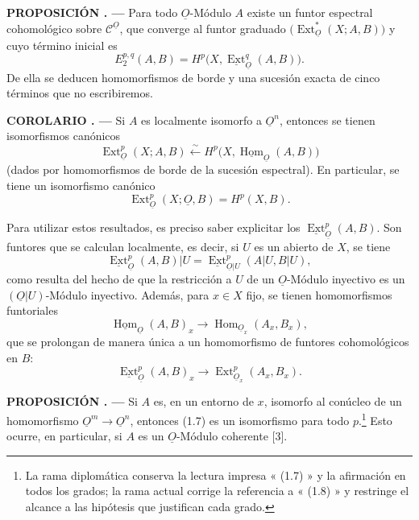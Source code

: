 \documentclass[11pt,twoside,openany]{book}
\numberwithin{equation}{section}
\newcommand{\Osh}{\underline{O}}
\newcommand{\Ccat}{\mathcal C}
\newcommand{\Homsh}{\underline{\operatorname{Hom}}}
\newcommand{\Extsh}{\underline{\operatorname{Ext}}}
\newcommand{\fquote}[1]{\textquotedbl#1\textquotedbl}
\theoremstyle{plain}
\theoremstyle{definition}
\theoremstyle{remark}
\newcommand{\result}[2]{%
  \par\medskip\noindent\textbf{#1%
  \if\relax\detokenize{#2}\relax\else\space#2\fi. ---}\enspace
}
\theoremstyle{plain}
\theoremstyle{definition}
\theoremstyle{remark}
\begin{document}
\result{PROPOSICIÓN}{1} Para todo $\Osh$-Módulo $A$ existe un funtor
espectral cohomológico sobre $\Ccat^{\Osh}$, que converge al funtor graduado
$\bigl(\operatorname{Ext}_{\Osh}^{*}(X;A,B)\bigr)$ y cuyo término inicial es
\begin{equation}\tag{1.4}
  E_{2}^{p,q}(A,B)=H^{p}\bigl(X,\Extsh_{\Osh}^{q}(A,B)\bigr).
\end{equation}
De ella se deducen \fquote{homomorfismos de borde} y una sucesión exacta de cinco términos
que no escribiremos.

\result{COROLARIO}{1} Si $A$ es localmente isomorfo a $\Osh^{n}$, entonces se tienen
isomorfismos canónicos
\begin{equation}\tag{1.5}
  \operatorname{Ext}_{\Osh}^{p}(X;A,B)
  \overset{\sim}{\longleftarrow}
  H^{p}\bigl(X,\Homsh_{\Osh}(A,B)\bigr)
\end{equation}
(dados por homomorfismos de borde de la sucesión espectral). En particular, se tiene
un isomorfismo canónico
\begin{equation}\tag{1.6}
  \operatorname{Ext}_{\Osh}^{p}(X;\Osh,B)=H^{p}(X,B).
\end{equation}

Para utilizar estos resultados, es preciso saber explicitar los
$\Extsh_{\Osh}^{p}(A,B)$. Son funtores que se calculan localmente,
es decir, si $U$ es un abierto de $X$, se tiene
\[
  \Extsh_{\Osh}^{p}(A,B)|U
  =\Extsh_{\Osh|U}^{p}(A|U,B|U),
\]
como resulta del hecho de que la restricción a $U$ de un $\Osh$-Módulo inyectivo
es un $(\Osh|U)$-Módulo inyectivo. Además, para $x\in X$ fijo, se tienen homomorfismos funtoriales
\begin{equation}\tag{1.7}
  \Homsh_{\Osh}(A,B)_x
  \longrightarrow
  \operatorname{Hom}_{\Osh_x}(A_x,B_x),
\end{equation}
que se prolongan de manera única a un homomorfismo de funtores cohomológicos
en $B$:
\begin{equation}\tag{1.8}
  \Extsh_{\Osh}^{p}(A,B)_x
  \longrightarrow
  \operatorname{Ext}_{\Osh_x}^{p}(A_x,B_x).
\end{equation}

\result{PROPOSICIÓN}{2} Si $A$ es, en un entorno de $x$, isomorfo al
conúcleo de un homomorfismo $\Osh^{m}\longrightarrow\Osh^{n}$, entonces (1.7) es un
isomorfismo para todo $p$.\footnote{La rama diplomática conserva la lectura
impresa « (1.7) » y la afirmación en todos los grados; la rama actual corrige
la referencia a « (1.8) » y restringe el alcance a las hipótesis que justifican
cada grado.} Esto ocurre, en
particular, si $A$ es un $\Osh$-Módulo coherente [3].
\end{document}
